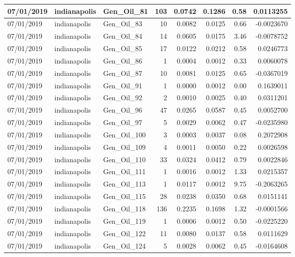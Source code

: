\documentclass[
  letterpaper,
  DIV=11,
  numbers=noendperiod]{scrartcl}
\begin{document}
\begin{tabular}{l|l|l|r|r|r|r|r}
\hline
07/01/2019 & indianapolis & Gen\_Oil\_81 & 103 & 0.0742 & 0.1286 & 0.58 & 0.0113255\\
\hline
07/01/2019 & indianapolis & Gen\_Oil\_83 & 10 & 0.0082 & 0.0125 & 0.66 & -0.0023670\\
\hline
07/01/2019 & indianapolis & Gen\_Oil\_84 & 14 & 0.0605 & 0.0175 & 3.46 & -0.0078752\\
\hline
07/01/2019 & indianapolis & Gen\_Oil\_85 & 17 & 0.0122 & 0.0212 & 0.58 & 0.0246773\\
\hline
07/01/2019 & indianapolis & Gen\_Oil\_86 & 1 & 0.0004 & 0.0012 & 0.33 & 0.0060078\\
\hline
07/01/2019 & indianapolis & Gen\_Oil\_87 & 10 & 0.0081 & 0.0125 & 0.65 & -0.0367019\\
\hline
07/01/2019 & indianapolis & Gen\_Oil\_91 & 1 & 0.0000 & 0.0012 & 0.00 & 0.1639011\\
\hline
07/01/2019 & indianapolis & Gen\_Oil\_92 & 2 & 0.0010 & 0.0025 & 0.40 & 0.0311201\\
\hline
07/01/2019 & indianapolis & Gen\_Oil\_96 & 47 & 0.0265 & 0.0587 & 0.45 & 0.0052700\\
\hline
07/01/2019 & indianapolis & Gen\_Oil\_97 & 5 & 0.0029 & 0.0062 & 0.47 & -0.0235980\\
\hline
07/01/2019 & indianapolis & Gen\_Oil\_100 & 3 & 0.0003 & 0.0037 & 0.08 & 0.2072908\\
\hline
07/01/2019 & indianapolis & Gen\_Oil\_109 & 4 & 0.0011 & 0.0050 & 0.22 & 0.0026598\\
\hline
07/01/2019 & indianapolis & Gen\_Oil\_110 & 33 & 0.0324 & 0.0412 & 0.79 & 0.0022846\\
\hline
07/01/2019 & indianapolis & Gen\_Oil\_111 & 1 & 0.0016 & 0.0012 & 1.33 & 0.0215357\\
\hline
07/01/2019 & indianapolis & Gen\_Oil\_113 & 1 & 0.0117 & 0.0012 & 9.75 & -0.2063265\\
\hline
07/01/2019 & indianapolis & Gen\_Oil\_115 & 28 & 0.0238 & 0.0350 & 0.68 & 0.0151141\\
\hline
07/01/2019 & indianapolis & Gen\_Oil\_118 & 136 & 0.2235 & 0.1698 & 1.32 & -0.0001566\\
\hline
07/01/2019 & indianapolis & Gen\_Oil\_119 & 1 & 0.0006 & 0.0012 & 0.50 & -0.0225220\\
\hline
07/01/2019 & indianapolis & Gen\_Oil\_122 & 11 & 0.0080 & 0.0137 & 0.58 & 0.0111629\\
\hline
07/01/2019 & indianapolis & Gen\_Oil\_124 & 5 & 0.0028 & 0.0062 & 0.45 & -0.0164608\\

\end{tabular}
\end{document}
